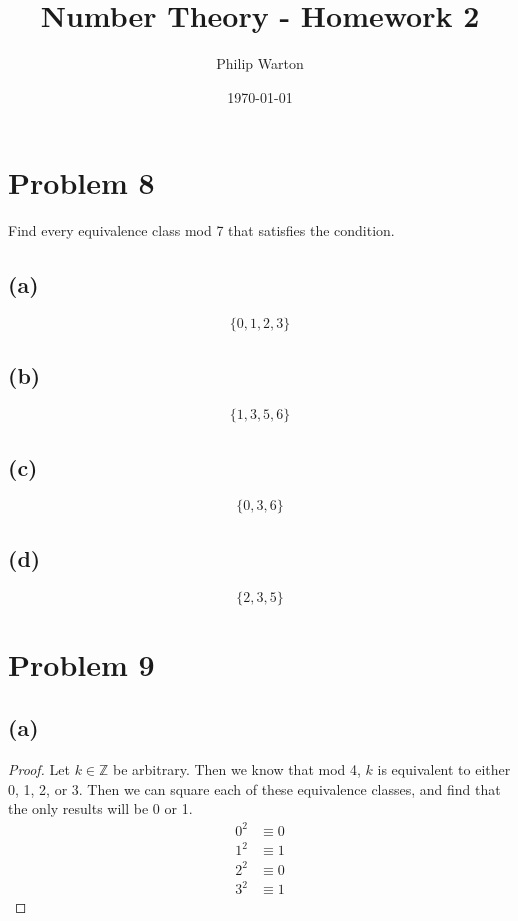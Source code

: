 \documentclass{article}
\theoremstyle{definition}
\begin{document}
\title{Number Theory - Homework 2}
\author{Philip Warton}
\date{\today}
\maketitle
\section*{Problem 8}
Find every equivalence class mod 7 that satisfies the condition.
\subsection*{(a)}
\[
    \{ 0,1,2,3 \}
\]
\subsection*{(b)}
\[
    \{ 1, 3, 5, 6\}
\]
\subsection*{(c)}
\[
    \{ 0, 3, 6 \}
\]
\subsection*{(d)}
\[
    \{ 2, 3, 5 \}
\]
\section*{Problem 9}
\subsection*{(a)}
\begin{proof}
    Let $k \in \mathbb{Z}$ be arbitrary. Then we know that mod 4, $k$ is equivalent to either
    0, 1, 2, or 3. Then we can square each of these equivalence classes, and find that the only 
    results will be 0 or 1.
    \begin{align*}
        0^2 & \equiv 0 \\
        1^2 & \equiv 1 \\
        2^2 & \equiv 0 \\
        3^2 & \equiv 1
    \end{align*}
\end{proof}
\end{document}
